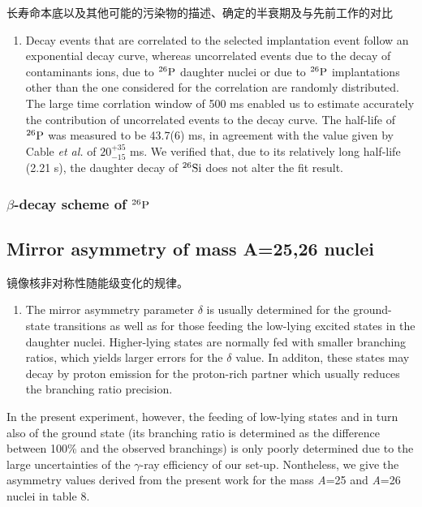 \documentclass[UTF8]{ctexart}
\begin{document}
长寿命本底以及其他可能的污染物的描述、确定的半衰期及与先前工作的对比
\begin{enumerate}
    \item Decay events that are correlated to the selected implantation event follow an exponential decay curve, whereas uncorrelated events due to the decay of contaminants ions, due to $^{26}\textnormal{P}$ daughter nuclei or due to $^{26}\textnormal{P}$ implantations other than the one considered for the correlation are randomly distributed. The large time corrlation window of 500 ms enabled us to estimate accurately the contribution of uncorrelated events to the decay curve. The half-life of $^{26}\textnormal{P}$ was measured to be 43.7(6) ms, in agreement with the value given by Cable \textit{et al.} of $20_{-15}^{+35}$ ms. We verified that, due to its relatively long half-life (2.21 s), the daughter decay of $^{26}\textnormal{Si}$ does not alter the fit result.
\end{enumerate}

\subsubsection{$\beta$-decay scheme of $^{26}\textnormal{P}$}
\subsection{Mirror asymmetry of mass A=25,26 nuclei}
镜像核非对称性随能级变化的规律。
\begin{enumerate}
    \item The mirror asymmetry parameter $\delta$ is usually determined for the ground-state transitions as well as for those feeding the low-lying excited states in the daughter nuclei. Higher-lying states are normally fed with smaller branching ratios, which yields larger errors for the $\delta$ value. In additon, these states may decay by proton emission for the proton-rich partner which usually reduces the branching ratio precision.
\end{enumerate}

In the present experiment, however, the feeding of low-lying states and in turn also of the ground state (its branching ratio is determined as the difference between 100\% and the observed branchings) is only poorly determined due to the large uncertainties of the $\gamma$-ray efficiency of our set-up. Nontheless, we give the asymmetry values derived from the present work for the mass \textit{A}=25 and \textit{A}=26 nuclei in table 8.
\end{document}
